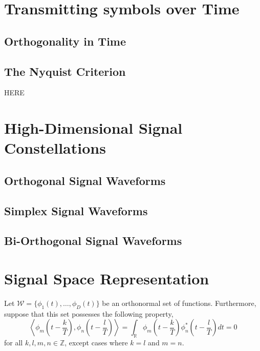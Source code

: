 \newpage

\section{Transmitting symbols over Time}

\subsection{Orthogonality in Time}

\subsection{The Nyquist Criterion}
HERE

\newpage

\section{High-Dimensional Signal Constellations}

\subsection{Orthogonal Signal Waveforms}

\subsection{Simplex Signal Waveforms}

\subsection{Bi-Orthogonal Signal Waveforms}


\section{Signal Space Representation}

Let $\mathcal{W} = \{ \phi_1 (t), \ldots, \phi_D (t) \}$ be an orthonormal set of functions.
Furthermore, suppose that this set possesses the following property,
\begin{equation*}
\left\langle \phi_m \left( t - \frac{k}{T} \right),
\phi_n \left( t - \frac{l}{T} \right) \right\rangle
= \int_{\mathbb{R}} \phi_m \left( t - \frac{k}{T} \right)
\phi_n^* \left( t - \frac{l}{T} \right) dt 
= 0
\end{equation*}
for all $k, l, m, n \in \mathbb{Z}$, except cases where $k = l$ and $m = n$.


